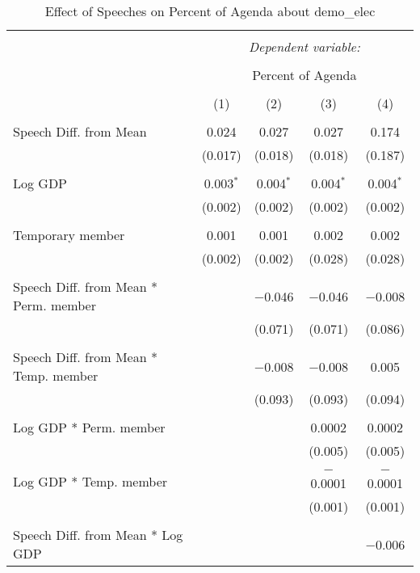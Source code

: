 
\begin{table}[!htbp] \centering 
  \caption{Effect of Speeches on Percent of Agenda about demo_elec} 
  \label{} 
\begin{tabular}{@{\extracolsep{5pt}}lcccc} 
\\[-1.8ex]\hline 
\hline \\[-1.8ex] 
 & \multicolumn{4}{c}{\textit{Dependent variable:}} \\ 
\cline{2-5} 
\\[-1.8ex] & \multicolumn{4}{c}{Percent of Agenda} \\ 
\\[-1.8ex] & (1) & (2) & (3) & (4)\\ 
\hline \\[-1.8ex] 
 Speech Diff. from Mean & 0.024 & 0.027 & 0.027 & 0.174 \\ 
  & (0.017) & (0.018) & (0.018) & (0.187) \\ 
  & & & & \\ 
 Log GDP & 0.003$^{*}$ & 0.004$^{*}$ & 0.004$^{*}$ & 0.004$^{*}$ \\ 
  & (0.002) & (0.002) & (0.002) & (0.002) \\ 
  & & & & \\ 
 Temporary member & 0.001 & 0.001 & 0.002 & 0.002 \\ 
  & (0.002) & (0.002) & (0.028) & (0.028) \\ 
  & & & & \\ 
 Speech Diff. from Mean * Perm. member &  & $-$0.046 & $-$0.046 & $-$0.008 \\ 
  &  & (0.071) & (0.071) & (0.086) \\ 
  & & & & \\ 
 Speech Diff. from Mean * Temp. member &  & $-$0.008 & $-$0.008 & 0.005 \\ 
  &  & (0.093) & (0.093) & (0.094) \\ 
  & & & & \\ 
 Log GDP * Perm. member &  &  & 0.0002 & 0.0002 \\ 
  &  &  & (0.005) & (0.005) \\ 
  & & & & \\ 
 Log GDP * Temp. member &  &  & $-$0.0001 & $-$0.0001 \\ 
  &  &  & (0.001) & (0.001) \\ 
  & & & & \\ 
 Speech Diff. from Mean * Log GDP &  &  &  & $-$0.006 \\ 

\end{tabular}
\end{table}
